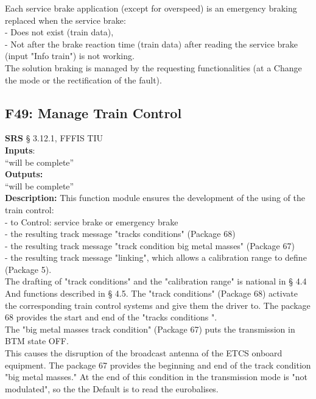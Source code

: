 \documentclass{template/openetcs_report}
\begin{document}
Each service brake application (except for overspeed) is an emergency braking 
replaced when the service brake: \\

- Does not exist (train data), \\

- Not after the brake reaction time (train data) after reading the service brake (input 
"Info train") is not working. \\

The solution braking is managed by the requesting functionalities (at a 
Change the mode or the rectification of the fault).\\

\subsection {F49: Manage Train Control}
\textbf{SRS} § 3.12.1, FFFIS TIU\\

\textbf{Inputs}:\\
``will be complete''\\
 
 \textbf{Outputs:}\\
 ``will be complete''\\
 
 \textbf{Description:} 
This function module ensures the development of the using of the train control: \\

- to Control: service brake or emergency brake\\

- the resulting track message "tracks conditions" (Package 68) \\

- the resulting track message "track condition big metal masses" (Package 67) \\

- the resulting track message "linking", which allows a calibration range to 
define (Package 5). \\

The drafting of "track conditions" and the "calibration range" is national in § 4.4 
And functions described in § 4.5. The "track conditions" (Package 68) activate the corresponding train control systems and give them 
the driver to. The package 68 provides the start and end of the "tracks 
conditions ". \\
The "big metal masses track condition" (Package 67) puts the transmission in BTM state 
OFF. \\
This causes the disruption of the broadcast antenna of the ETCS onboard equipment. 
The package 67 provides the beginning and end of the track condition "big metal masses." 
At the end of this condition in the transmission mode is "not modulated", so the the 
Default is to read the eurobalises. \\
\end{document}
